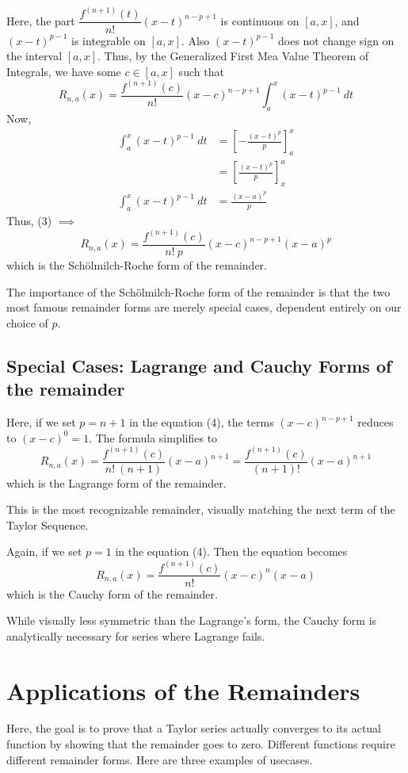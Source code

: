 \documentclass[12pt, a4paper]{article}
\theoremstyle{definition}
\theoremstyle{remark}
\begin{document}
Here, the part $\dfrac{f^{(n+1)}(t)}{n!}(x-t)^{n-p+1}$ is continuous on $[a,x]$, and $(x-t)^{p-1}$ is integrable on $[a,x]$. Also $(x-t)^{p-1}$ does not change sign on the interval $[a,x]$. Thus, by the Generalized First Mea Value Theorem of Integrals, we have some $c \in [a,x]$ such that
\[
R_{n,a}(x) = \frac{f^{(n+1)}(c)}{n!}(x-c)^{n-p+1} \int_{a}^{x} (x-t)^{p-1} \ dt \tag{3}
\]
Now,
\begin{align*}
    \int_{a}^{x} (x-t)^{p-1} \ dt &= \left[-\frac{(x-t)^p}{p}\right]_a^x \\
    &= \left[\frac{(x-t)^p}{p}\right]_x^a \\
    \int_{a}^{x} (x-t)^{p-1} \ dt &= \frac{(x-a)^p}{p}
\end{align*}
Thus, (3) $\implies$
\[
R_{n,a}(x) = \frac{f^{(n+1)}(c)}{n! \ p}(x-c)^{n-p+1}(x-a)^p \tag{4}
\] which is the Sch\"{o}lmilch-Roche form of the remainder.

The importance of the Sch\"{o}lmilch-Roche form of the remainder is that the two most famous remainder forms are merely special cases, dependent entirely on our choice of $p$.

\subsection{Special Cases: Lagrange and Cauchy Forms of the remainder}
Here, if we set $p = n + 1$ in the equation (4), the terms $(x-c)^{n-p+1}$ reduces to $(x-c)^0 = 1$. The formula simplifies to
\[
R_{n,a}(x) = \frac{f^{(n+1)}(c)}{n! \ (n+1)}(x-a)^{n+1} = \frac{f^{(n+1)}(c)}{(n+1)!}(x-a)^{n+1} \tag{5}
\] which is the Lagrange form of the remainder.

This is the most recognizable remainder, visually matching the next term of the Taylor Sequence.

Again, if we set $p = 1$ in the equation (4). Then the equation becomes
\[
R_{n,a}(x) = \frac{f^{(n+1)}(c)}{n!}(x-c)^{n}(x-a) \tag{6}
\] which is the Cauchy form of the remainder.

While visually less symmetric than the Lagrange's form, the Cauchy form is analytically necessary for series where Lagrange fails.

\section{Applications of the Remainders}
Here, the goal is to prove that a Taylor series actually converges to its actual function by showing that the remainder goes to zero. Different functions require different remainder forms. Here are three examples of usecases.
\end{document}
